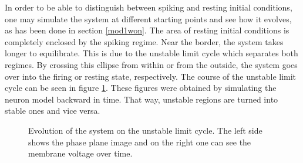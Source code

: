 \documentclass[12pt,a4paper]{article}
\begin{document}
In order to be able to distinguish between spiking and resting initial conditions, one may simulate the system at different starting points and see how it evolves, as has been done in section \ref{mod1won}.
The area of resting initial conditions is completely enclosed by the spiking regime. Near the border, the system takes longer to equilibrate. This is due to the unstable limit cycle which separates both regimes. By crossing this ellipse from within or from the outside, the system goes over into the firing or resting state, respectively. The course of the unstable limit cycle can be seen in figure \ref{unstable}. These figures were obtained by simulating the neuron model backward in time. That way, unstable regions are turned into stable ones and vice versa. 
\begin{figure}[H]
	\caption{Evolution of the system on the unstable limit cycle. The left side shows the phase plane image and on the right one can see the membrane voltage over time.}
	\label{unstable} 
\end{figure}
\end{document}
